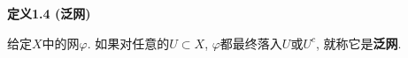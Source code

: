 \documentclass[UTF8]{ctexart}
\begin{document}
\vspace{10pt}

\hypertarget{sec:定义1.4}{}
\noindent\textbf{定义1.4 (泛网)}

给定$X$中的网$\varphi$. 如果对任意的$U\subset X$,
$\varphi$都最终落入$U$或$U^c$, 就称它是\textbf{泛网}.









\end{document}
